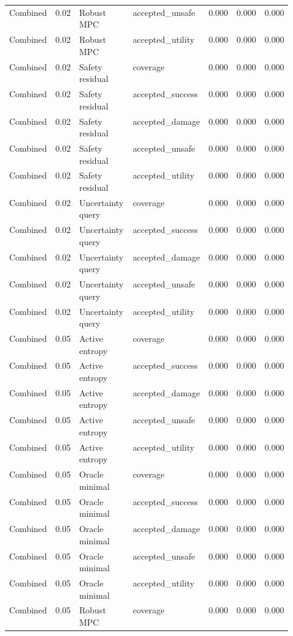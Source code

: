 \documentclass{article}
\begin{document}
\begin{center}
\begin{longtable}{p{0.13\linewidth}rp{0.22\linewidth}p{0.19\linewidth}rrr}
Combined & 0.02 & Robust MPC & accepted\_unsafe & 0.000 & 0.000 & 0.000\\
Combined & 0.02 & Robust MPC & accepted\_utility & 0.000 & 0.000 & 0.000\\
Combined & 0.02 & Safety residual & coverage & 0.000 & 0.000 & 0.000\\
Combined & 0.02 & Safety residual & accepted\_success & 0.000 & 0.000 & 0.000\\
Combined & 0.02 & Safety residual & accepted\_damage & 0.000 & 0.000 & 0.000\\
Combined & 0.02 & Safety residual & accepted\_unsafe & 0.000 & 0.000 & 0.000\\
Combined & 0.02 & Safety residual & accepted\_utility & 0.000 & 0.000 & 0.000\\
Combined & 0.02 & Uncertainty query & coverage & 0.000 & 0.000 & 0.000\\
Combined & 0.02 & Uncertainty query & accepted\_success & 0.000 & 0.000 & 0.000\\
Combined & 0.02 & Uncertainty query & accepted\_damage & 0.000 & 0.000 & 0.000\\
Combined & 0.02 & Uncertainty query & accepted\_unsafe & 0.000 & 0.000 & 0.000\\
Combined & 0.02 & Uncertainty query & accepted\_utility & 0.000 & 0.000 & 0.000\\
Combined & 0.05 & Active entropy & coverage & 0.000 & 0.000 & 0.000\\
Combined & 0.05 & Active entropy & accepted\_success & 0.000 & 0.000 & 0.000\\
Combined & 0.05 & Active entropy & accepted\_damage & 0.000 & 0.000 & 0.000\\
Combined & 0.05 & Active entropy & accepted\_unsafe & 0.000 & 0.000 & 0.000\\
Combined & 0.05 & Active entropy & accepted\_utility & 0.000 & 0.000 & 0.000\\
Combined & 0.05 & Oracle minimal & coverage & 0.000 & 0.000 & 0.000\\
Combined & 0.05 & Oracle minimal & accepted\_success & 0.000 & 0.000 & 0.000\\
Combined & 0.05 & Oracle minimal & accepted\_damage & 0.000 & 0.000 & 0.000\\
Combined & 0.05 & Oracle minimal & accepted\_unsafe & 0.000 & 0.000 & 0.000\\
Combined & 0.05 & Oracle minimal & accepted\_utility & 0.000 & 0.000 & 0.000\\
Combined & 0.05 & Robust MPC & coverage & 0.000 & 0.000 & 0.000\\

\end{longtable}
\end{center}
\end{document}
